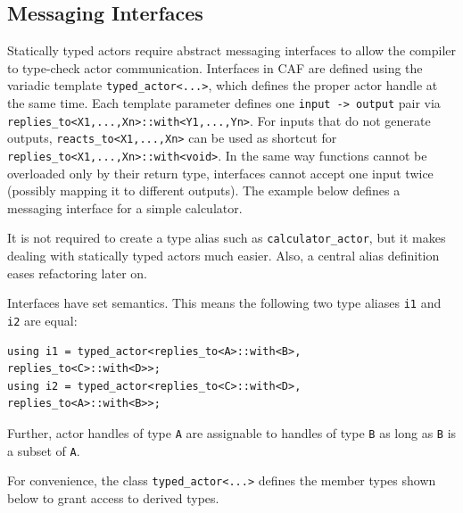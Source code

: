 \clearpage
\subsection{Messaging Interfaces}
\label{interface}

Statically typed actors require abstract messaging interfaces to allow the compiler to type-check actor communication.
Interfaces in CAF are defined using the variadic template \lstinline^typed_actor<...>^, which defines the proper actor handle at the same time.
Each template parameter defines one \lstinline^input -> output^ pair via \lstinline^replies_to<X1,...,Xn>::with<Y1,...,Yn>^.
For inputs that do not generate outputs, \lstinline^reacts_to<X1,...,Xn>^ can be used as shortcut for \lstinline^replies_to<X1,...,Xn>::with<void>^. In the same way functions cannot be overloaded only by their return type, interfaces cannot accept one input twice (possibly mapping it to different outputs). The example below defines a messaging interface for a simple calculator.



It is not required to create a type alias such as \lstinline^calculator_actor^, but it makes dealing with statically typed actors much easier.
Also, a central alias definition eases refactoring later on.

Interfaces have set semantics. This means the following two type aliases \lstinline^i1^ and \lstinline^i2^ are equal:

\begin{lstlisting}
using i1 = typed_actor<replies_to<A>::with<B>, replies_to<C>::with<D>>;
using i2 = typed_actor<replies_to<C>::with<D>, replies_to<A>::with<B>>;
\end{lstlisting}

Further, actor handles of type \lstinline^A^ are assignable to handles of type \lstinline^B^ as long as \lstinline^B^ is a subset of \lstinline^A^.

For convenience, the class \lstinline^typed_actor<...>^ defines the member types shown below to grant access to derived types.

